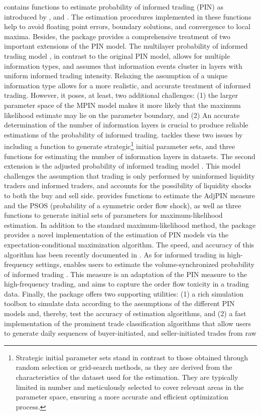  contains functions to estimate probability of informed trading (PIN) as introduced by \cite{easley1992time}, and  \cite{easley1996liquidity}. The estimation procedures implemented in these functions help to avoid floating point errors, boundary solutions, and convergence to local maxima. Besides, the package provides a comprehensive treatment of two important extensions of the PIN model. The multilayer probability of informed trading model \citep[MPIN model;][]{ersan2016multilayer}, in contrast to the original PIN model, allows for multiple information types, and assumes that information events cluster in layers with uniform informed trading intensity. Relaxing the assumption of a unique information type allows for a more realistic, and accurate treatment of informed trading. However, it poses, at least, two additional challenges: (1) the larger parameter space of the MPIN model makes it more likely that the maximum likelihood estimate may lie on the parameter boundary, and (2) An accurate determination of the number of information layers is crucial to produce reliable estimations of the probability of informed trading.  tackles these two issues by including a function to generate strategic\footnote{Strategic initial parameter sets stand in contrast to those obtained through random selection or grid-search methods, as they are derived from the characteristics of the dataset used for the estimation. They are typically limited in number and meticulously selected to cover relevant areas in the parameter space,  ensuring a more accurate and efficient optimization process.} initial parameter sets, and three functions for estimating the number of information layers in datasets. The second extension is the adjusted probability of informed trading model \citep[AdjPIN model;][]{duarte2009why}. This model challenges the assumption that trading is only performed by uninformed liquidity traders and informed traders, and accounts for the possibility of liquidity shocks to both the buy and sell side.  provides functions to estimate the AdjPIN measure and the PSOS (probability of a symmetric order flow shock), as well as three functions to generate initial sets of parameters for maximum-likelihood estimation. In addition to the standard maximum-likelihood method, the package provides a novel implementation of the estimation of PIN models via the expectation-conditional maximization algorithm. The speed, and accuracy of this algorithm has been recently documented in \cite{ghachem2022maximum}. As for informed trading in high-frequency settings,  enables users to estimate the volume-synchronized probability of informed trading \citep[VPIN;][]{Easley2011microstructure, Easley2012Flow}. This measure is an adaptation of the PIN measure to the high-frequency trading, and aims to capture the order flow toxicity in a trading data. Finally, the package offers two supporting utilities: (1) a rich simulation toolbox to simulate data according to the assumptions of the different PIN models and, thereby, test the accuracy of estimation algorithms, and (2) a fast implementation of the prominent trade classification algorithms that allow users to generate daily sequences of buyer-initiated, and seller-initiated trades from raw 